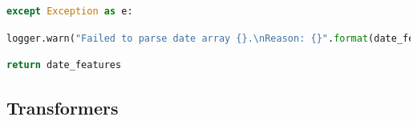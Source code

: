 \documentclass[
  11pt,
  a4paper,
  DIV=12,captions=tableheading,oneside]{scrbook}
\begin{document}
\begin{lstlisting}[language=Python,stepnumber=2,basicstyle=\footnotesize]
    except Exception as e:\end{lstlisting}
\begin{lstlisting}[language=Python,stepnumber=2,basicstyle=\footnotesize]
        logger.warn("Failed to parse date array {}.\nReason: {}".format(date_features, e))\end{lstlisting}
\begin{lstlisting}[language=Python,stepnumber=2,basicstyle=\footnotesize]
    return date_features\end{lstlisting}

\hypertarget{appendix-transformers}{%
\subsection{Transformers}\label{appendix-transformers}}
\end{document}
